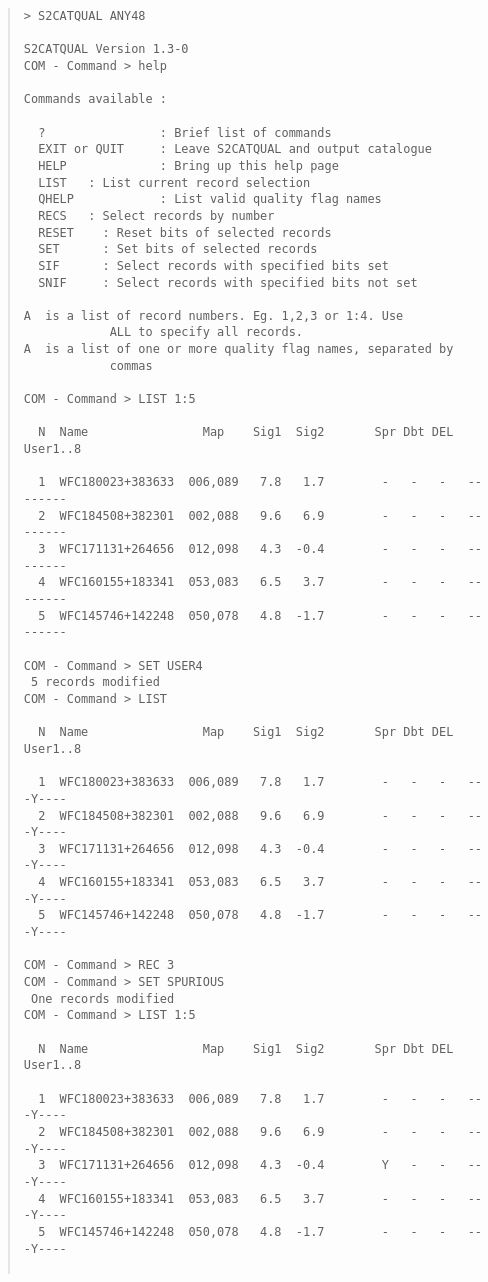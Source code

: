 \documentclass{book}
\renewcommand{\_}{{\tt\char'137}}     %
\begin{document}
\begin{quote}\begin{verbatim}
> S2CATQUAL ANY48

S2CATQUAL Version 1.3-0
COM - Command > help

Commands available :

  ?                : Brief list of commands
  EXIT or QUIT     : Leave S2CATQUAL and output catalogue
  HELP             : Bring up this help page
  LIST   : List current record selection
  QHELP            : List valid quality flag names
  RECS   : Select records by number
  RESET    : Reset bits of selected records
  SET      : Set bits of selected records
  SIF      : Select records with specified bits set
  SNIF     : Select records with specified bits not set

A  is a list of record numbers. Eg. 1,2,3 or 1:4. Use
            ALL to specify all records.
A  is a list of one or more quality flag names, separated by
            commas

COM - Command > LIST 1:5

  N  Name                Map    Sig1  Sig2       Spr Dbt DEL  User1..8

  1  WFC180023+383633  006,089   7.8   1.7        -   -   -   --------
  2  WFC184508+382301  002,088   9.6   6.9        -   -   -   --------
  3  WFC171131+264656  012,098   4.3  -0.4        -   -   -   --------
  4  WFC160155+183341  053,083   6.5   3.7        -   -   -   --------
  5  WFC145746+142248  050,078   4.8  -1.7        -   -   -   --------

COM - Command > SET USER4
 5 records modified
COM - Command > LIST

  N  Name                Map    Sig1  Sig2       Spr Dbt DEL  User1..8

  1  WFC180023+383633  006,089   7.8   1.7        -   -   -   ---Y----
  2  WFC184508+382301  002,088   9.6   6.9        -   -   -   ---Y----
  3  WFC171131+264656  012,098   4.3  -0.4        -   -   -   ---Y----
  4  WFC160155+183341  053,083   6.5   3.7        -   -   -   ---Y----
  5  WFC145746+142248  050,078   4.8  -1.7        -   -   -   ---Y----

COM - Command > REC 3
COM - Command > SET SPURIOUS
 One records modified
COM - Command > LIST 1:5

  N  Name                Map    Sig1  Sig2       Spr Dbt DEL  User1..8

  1  WFC180023+383633  006,089   7.8   1.7        -   -   -   ---Y----
  2  WFC184508+382301  002,088   9.6   6.9        -   -   -   ---Y----
  3  WFC171131+264656  012,098   4.3  -0.4        Y   -   -   ---Y----
  4  WFC160155+183341  053,083   6.5   3.7        -   -   -   ---Y----
  5  WFC145746+142248  050,078   4.8  -1.7        -   -   -   ---Y----


\end{verbatim}
\end{quote}
\end{document}
